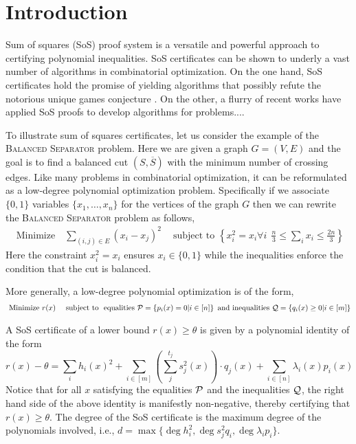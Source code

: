 \section{Introduction}
\label{sec:intro}

Sum of squares (SoS) proof system is a versatile and powerful approach to certifying polynomial inequalities. 
%
SoS certificates can be shown to underly a vast number of algorithms in combinatorial optimization. 
%
On the one hand, SoS certificates hold the promise of yielding algorithms that possibly refute the notorious unique games conjecture \cite{BarakBHMSZ}.  
%
On the other, a flurry of recent works have applied SoS proofs to develop algorithms for problems....  

To illustrate sum of squares certificates, let us consider the example of the
\textsc{Balanced Separator} problem.  Here we are given a graph $G = (V,E)$ and the goal is to find a balanced cut $(S,\overline{S})$ with the minimum number of crossing edges.
%
Like many problems in combinatorial optimization, it can be reformulated as a low-degree polynomial optimization problem.  
%
Specifically if we associate $\{0,1\}$ variables $\{x_1,\ldots,x_n\}$ for the vertices of the graph $G$ then we can rewrite the \textsc{Balanced Separator} problem as follows,
\begin{align*}
\text{ Minimize } \ \ \  \sum_{(i,j) \in E} (x_i-x_j)^2  \ \ \ \ \text{ subject to } \left\{ x_i^2 = x_i \forall i\ \ \frac{n}{3} \leq \sum_i x_i \leq \frac{2n}{3} \right\}
\end{align*} 
Here the constraint $x_i^2 = x_i$ ensures $x_i \in \{0,1\}$ while the inequalities enforce the condition that the cut is balanced.

More generally, a low-degree polynomial optimization is of the form,
\begin{align*}
\text{ Minimize } & r(x)   & \text{ subject to } \text{ equalities } \mathcal P = \left\{ p_i(x) = 0 | i \in [n] \right\} \text{ and inequalities } \mathcal Q = \left\{ q_i(x) \geq 0 | i \in [m] \right\}
\end{align*} 

A SoS certificate of a lower bound $ r(x) \geq \theta$ is given by a polynomial identity of the form
\[ r(x) - \theta  = \sum_{i} h_i(x)^2 + \sum_{i \in [m]} \left(\sum_{j}^{t_j} s_j^2(x) \right) \cdot q_j(x) + \sum_{i \in [n]} \lambda_i(x) p_i(x) \]
Notice that for all $x$ satisfying the equalities $\mathcal P$ and the inequalities $\mathcal Q$, the right hand side of the above identity is manifestly non-negative, thereby certifying that $r(x) \geq \theta$.  The degree of the SoS certificate is the maximum degree of the polynomials involved, i.e., $d = \max\{\deg h_i^2, \deg s_j^2 q_i, \deg \lambda_i p_i\}$.

